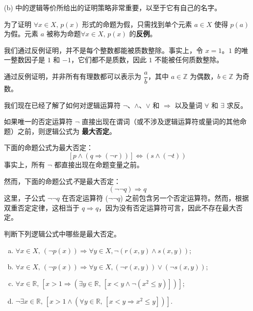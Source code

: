 (b) 中的逻辑等价所给出的证明策略非常重要，以至于它有自己的名字。

\begin{strategy}[反例证明]
\label{strCounterexample}
为了证明 $\forall x \in X,\, p(x)$ 形式的命题为假，只需找到单个元素 $a \in X$ 使得 $p(a)$ 为假。元素 $a$ 被称为命题$\forall x \in X,\, p(x)$ 的\textbf{反例}。
\end{strategy}

\begin{example}
我们通过反例证明，并不是每个整数都能被质数整除。事实上，令 $x = 1$。$1$ 的唯一整数因子是 $1$ 和 $-1$，它们都不是质数，因此 $1$ 不能被任何质数整除。
\end{example}

\begin{exercise}
通过反例证明，并非所有有理数都可以表示为 $\dfrac{a}{b}$，其中 $a \in \mathbb{Z}$ 为偶数，$b \in \mathbb{Z}$ 为奇数。
\end{exercise}

我们现在已经了解了如何对逻辑运算符 $\neg$、$\wedge$、$\vee$ 和 $\Rightarrow$ 以及量词 $\forall$ 和 $\exists$ 求反。

\begin{definition}
\label{defMaximallyNegatedLogicalFormula}
如果唯一的否定运算符 $\neg$ 直接出现在谓词（或不涉及逻辑运算符或量词的其他命题）之前，则逻辑公式为 \textbf{最大否定}。
\end{definition}

\begin{example}
下面的命题公式为最大否定：
\[ [p \wedge (q \Rightarrow (\neg r))] \Leftrightarrow (s \wedge (\neg t))\]
事实上，所有 $\neg$ 都直接出现在命题变量之前。

然而，下面的命题公式\textit{不}是最大否定：
\[ (\neg \neg q) \Rightarrow q\]
这里，子公式 $\neg \neg q$ 在否定运算符 ($\neg \neg q$) 之前包含另一个否定运算符。然而，根据双重否定定律，这相当于 $q \Rightarrow q$，因为没有否定运算符可言，因此不存在最大否定。
\end{example}

\begin{exercise}
判断下列逻辑公式中哪些是最大否定。
\begin{enumerate}[(a)]
\item $\forall x \in X,\, (\neg p(x)) \Rightarrow \forall y \in X, \neg (r(x,y) \wedge s(x,y))$;
\item $\forall x \in X,\, (\neg p(x)) \Rightarrow \forall y \in X, (\neg r(x,y)) \vee (\neg s(x,y))$;
\item $\forall x \in \mathbb{R},\, [x > 1 \Rightarrow (\exists y \in \mathbb{R},\, [x < y \wedge \neg (x^2 \le y)])]$;
\item $\neg \exists x \in \mathbb{R},\, [x > 1 \wedge (\forall y \in \mathbb{R},\, [x < y \Rightarrow x^2 \le y])]$.
\end{enumerate}
\end{exercise}

